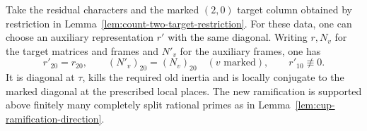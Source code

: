 \begin{proposition}\label{prop:count-two-auxiliary-datum}
Take the residual characters and the marked \((2,0)\) target
column obtained by restriction in
Lemma~\ref{lem:count-two-target-restriction}. For these data,
one can choose an auxiliary representation \(r'\) with the same diagonal.
Writing \(r,N_v\) for the target matrices and frames and \(N'_v\) for the auxiliary frames, one has
\[
 r'_{20}=r_{20},\qquad (N'_v)_{20}=(N_v)_{20}\quad(v\text{ marked}),
                         \qquad r'_{10}\not\equiv0 .
\] It is diagonal at
\(\tau\), kills the required old inertia and is locally conjugate
to the marked diagonal at the prescribed local places. The new
ramification is supported above finitely many completely split
rational primes as in Lemma~\ref{lem:cup-ramification-direction}.
\end{proposition}

